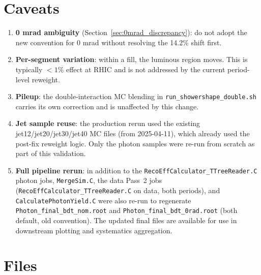 \documentclass[11pt,letterpaper]{article}
\begin{document}
\section{Caveats}
\label{sec:caveats}

\begin{enumerate}
  \item \textbf{0 mrad ambiguity} (Section~\ref{sec:0mrad_discrepancy}):
    do not adopt the new convention for 0 mrad without resolving
    the 14.2\% shift first.
  \item \textbf{Per-segment variation}: within a fill, the luminous
    region moves. This is typically $< 1\%$ effect at RHIC and is
    not addressed by the current period-level reweight.
  \item \textbf{Pileup}: the double-interaction MC blending in
    \texttt{run\_showershape\_double.sh} carries its own correction
    and is unaffected by this change.
  \item \textbf{Jet sample reuse}: the production rerun used the
    existing jet12/jet20/jet30/jet40 MC files (from 2025-04-11),
    which already used the post-fix reweight logic. Only the
    photon samples were re-run from scratch as part of this
    validation.
  \item \textbf{Full pipeline rerun}: in addition to the
    \texttt{RecoEffCalculator\_TTreeReader.C} photon jobs,
    \texttt{MergeSim.C}, the data Pass~2 jobs
    (\texttt{RecoEffCalculator\_TTreeReader.C} on data, both periods),
    and \texttt{CalculatePhotonYield.C} were also re-run to regenerate
    \texttt{Photon\_final\_bdt\_nom.root} and
    \texttt{Photon\_final\_bdt\_0rad.root} (both default, old
    convention). The updated final files are available for use in
    downstream plotting and systematics aggregation.
\end{enumerate}

\section{Files}
\label{sec:files}
\end{document}
